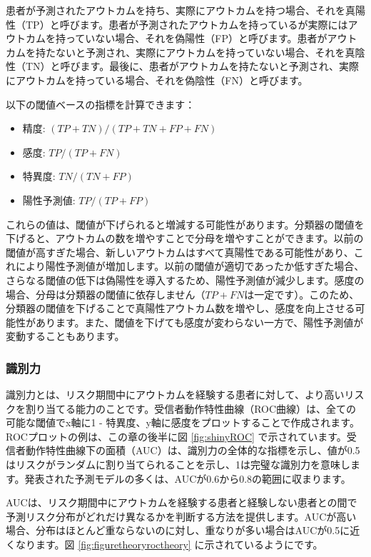 \documentclass[
  11pt]{book}
\providecommand{\tightlist}{%
  \setlength{\itemsep}{0pt}\setlength{\parskip}{0pt}}
\theoremstyle{definition}
\theoremstyle{definition}
\theoremstyle{definition}
\theoremstyle{definition}
\theoremstyle{remark}
\begin{document}
患者が予測されたアウトカムを持ち、実際にアウトカムを持つ場合、それを真陽性（TP）と呼びます。患者が予測されたアウトカムを持っているが実際にはアウトカムを持っていない場合、それを偽陽性（FP）と呼びます。患者がアウトカムを持たないと予測され、実際にアウトカムを持っていない場合、それを真陰性（TN）と呼びます。最後に、患者がアウトカムを持たないと予測され、実際にアウトカムを持っている場合、それを偽陰性（FN）と呼びます。    

以下の閾値ベースの指標を計算できます：

\begin{itemize}
\tightlist
\item
  精度: \((TP+TN)/(TP+TN+FP+FN)\)
\item
  感度: \(TP/(TP+FN)\)
\item
  特異度: \(TN/(TN+FP)\)
\item
  陽性予測値: \(TP/(TP+FP)\)
\end{itemize}

これらの値は、閾値が下げられると増減する可能性があります。分類器の閾値を下げると、アウトカムの数を増やすことで分母を増やすことができます。以前の閾値が高すぎた場合、新しいアウトカムはすべて真陽性である可能性があり、これにより陽性予測値が増加します。以前の閾値が適切であったか低すぎた場合、さらなる閾値の低下は偽陽性を導入するため、陽性予測値が減少します。感度の場合、分母は分類器の閾値に依存しません（\(TP+FN\)は一定です）。このため、分類器の閾値を下げることで真陽性アウトカム数を増やし、感度を向上させる可能性があります。また、閾値を下げても感度が変わらない一方で、陽性予測値が変動することもあります。

\subsubsection*{識別力}\label{ux8b58ux5225ux529b}

識別力とは、リスク期間中にアウトカムを経験する患者に対して、より高いリスクを割り当てる能力のことです。受信者動作特性曲線（ROC曲線）は、全ての可能な閾値でx軸に1 - 特異度、y軸に感度をプロットすることで作成されます。ROCプロットの例は、この章の後半に図 \ref{fig:shinyROC} で示されています。受信者動作特性曲線下の面積（AUC）は、識別力の全体的な指標を示し、値が0.5はリスクがランダムに割り当てられることを示し、1は完璧な識別力を意味します。発表された予測モデルの多くは、AUCが0.6から0.8の範囲に収まります。   

AUCは、リスク期間中にアウトカムを経験する患者と経験しない患者との間で予測リスク分布がどれだけ異なるかを判断する方法を提供します。AUCが高い場合、分布はほとんど重ならないのに対し、重なりが多い場合はAUCが0.5に近くなります。図 \ref{fig:figuretheoryroctheory} に示されているようにです。
\end{document}
